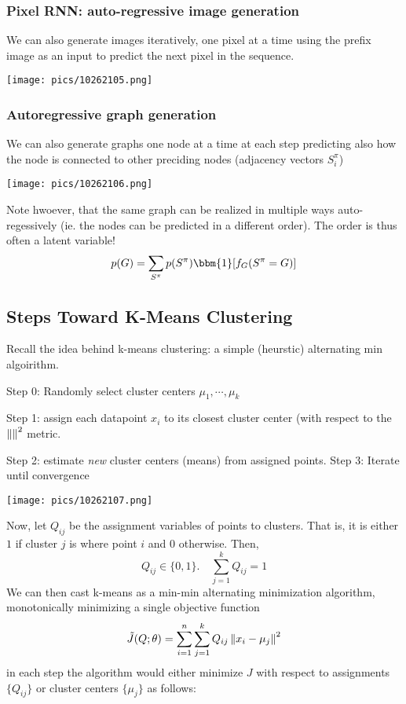 \documentclass[11pt]{scrartcl}
\begin{document}
\subsubsection{Pixel RNN: auto-regressive image generation}
We can also generate images iteratively, one pixel at a time using the prefix image as an input to predict the next pixel in the sequence.
\begin{center}
    \texttt{[image: pics/10262105.png]}
\end{center}

\subsubsection{Autoregressive graph generation}
We can also generate graphs one node at a time at each step predicting also how the node is connected to other preciding nodes (adjacency vectors $S_i^{\pi}$) 
\begin{center}
    \texttt{[image: pics/10262106.png]}
\end{center}

Note hwoever, that the same graph can be realized in multiple ways auto-regessively (ie. the nodes can be predicted in a different order). The order is thus often a latent variable!
$$p(G)=\sum_{S^\pi}p(S^{\pi})\bbm{1}[f_{G}(S^{\pi}=G)]$$

\subsection{Steps Toward K-Means Clustering}
Recall the idea behind k-means clustering: a simple (heurstic) alternating min algoirithm. 

Step 0: Randomly select cluster centers $\mu_1,\cdots,\mu_k$

Step 1: assign each datapoint $x_i$ to its closest cluster center (with respect to the $\left\lVert\right\rVert^2$ metric. 


Step 2: estimate \textit{new} cluster centers (means) from assigned points. 
Step 3: Iterate until convergence

\begin{center}
    \texttt{[image: pics/10262107.png]}
\end{center}

Now, let $Q_{ij}$ be the assignment variables of points to clusters. That is, it is either $1$ if cluster $j$ is where point $i$ and $0$ otherwise. Then, $$Q_{ij} \in \{0,1\}. \quad \sum_{j=1}^{k}Q_{ij}=1$$
We can then cast k-means as a min-min alternating minimization algorithm,
monotonically minimizing a single objective function
$$\tilde{J}(Q;\theta)=\sum_{i=1}^{n}\sum_{j=1}^{k}Q_{ij}\left\lVert x_i-\mu_j\right\rVert^2$$
in each step the algorithm would either minimize $J$ with respect to assignments $\{Q_{ij}\}$ or cluster centers $\{\mu_j\}$ as follows:
\end{document}
